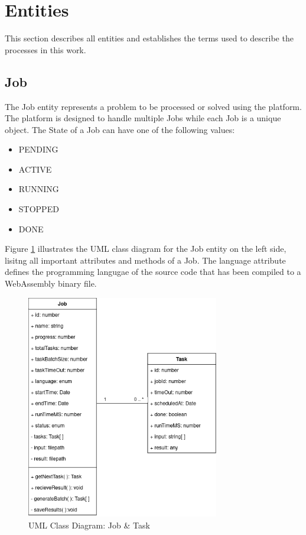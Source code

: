 \section{Entities}
\label{sec:methodology:entities}
This section describes all entities and establishes the terms used to describe the processes in this work.

\subsection{Job}
\label{subsec:methodology:entities:job}
The Job entity represents a problem to be processed or solved using the platform. The platform is designed to handle multiple Jobs while each Job is a unique object. The State of a Job can have one of the following values:
\begin{itemize}
  \item PENDING
  \item ACTIVE
  \item RUNNING
  \item STOPPED
  \item DONE
\end{itemize}
Figure \ref{fig:methodology:job-task} illustrates the \ac{UML} class diagram for the Job entity on the left side, lisitng all important attributes and methods of a Job. The language attribute defines the programming langugae of the source code that has been compiled to a WebAssembly binary file.
\begin{figure}[htbp]
  \centering
  \includegraphics[width=0.75\textwidth]{gfx/figures/Job-Task.png}
  \caption{\ac{UML} Class Diagram: Job \& Task}
  \label{fig:methodology:job-task}
\end{figure}

